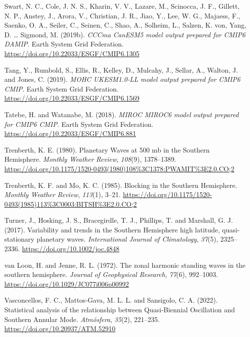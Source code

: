 \documentclass[12pt,oneside,a4paper]{reedthesis}
\newlength{\cslhangindent}
\newenvironment{CSLReferences}[2] %
 {%
  \setlength{\parindent}{0pt}
  \ifodd #1 \everypar{\setlength{\hangindent}{\cslhangindent}}\ignorespaces\fi
  \ifnum #2 > 0
  \setlength{\parskip}{#2\baselineskip}
  \fi
 }%
 {}
\begin{document}
\begin{CSLReferences}{1}{0}
\leavevmode{}%
Swart, N. C., Cole, J. N. S., Kharin, V. V., Lazare, M., Scinocca, J. F., Gillett, N. P., Anstey, J., Arora, V., Christian, J. R., Jiao, Y., Lee, W. G., Majaess, F., Saenko, O. A., Seiler, C., Seinen, C., Shao, A., Solheim, L., Salzen, K. von, Yang, D. \ldots{} Sigmond, M. (2019b). \emph{CCCma CanESM5 model output prepared for CMIP6 DAMIP}. Earth System Grid Federation. \url{https://doi.org/10.22033/ESGF/CMIP6.1305}

\leavevmode{}%
Tang, Y., Rumbold, S., Ellis, R., Kelley, D., Mulcahy, J., Sellar, A., Walton, J. and Jones, C. (2019). \emph{MOHC UKESM1.0-LL model output prepared for CMIP6 CMIP}. Earth System Grid Federation. \url{https://doi.org/10.22033/ESGF/CMIP6.1569}

\leavevmode{}%
Tatebe, H. and Watanabe, M. (2018). \emph{MIROC MIROC6 model output prepared for CMIP6 CMIP}. Earth System Grid Federation. \url{https://doi.org/10.22033/ESGF/CMIP6.881}

\leavevmode{}%
Trenberth, K. E. (1980). Planetary {Waves} at 500 mb in the {Southern Hemisphere}. \emph{Monthly Weather Review}, \emph{108}(9), 1378--1389. \url{https://doi.org/10.1175/1520-0493(1980)108\%3C1378:PWAMIT\%3E2.0.CO;2}

\leavevmode{}%
Trenberth, K. F. and Mo, K. C. (1985). Blocking in the {Southern Hemisphere}. \emph{Monthly Weather Review}, \emph{113}(1), 3--21. \url{https://doi.org/10.1175/1520-0493(1985)113\%3C0003:BITSH\%3E2.0.CO;2}

\leavevmode{}%
Turner, J., Hosking, J. S., Bracegirdle, T. J., Phillips, T. and Marshall, G. J. (2017). Variability and trends in the {Southern Hemisphere} high latitude, quasi-stationary planetary waves. \emph{International Journal of Climatology}, \emph{37}(5), 2325--2336. \url{https://doi.org/10.1002/joc.4848}

\leavevmode{}%
van Loon, H. and Jenne, R. L. (1972). The zonal harmonic standing waves in the southern hemisphere. \emph{Journal of Geophysical Research}, \emph{77}(6), 992--1003. \url{https://doi.org/10.1029/JC077i006p00992}

\leavevmode{}%
Vasconcellos, F. C., Mattos-Gava, M. L. L. and Sansigolo, C. A. (2022). Statistical analysis of the relationship between {Quasi-Biennial Oscillation} and {Southern Annular Mode}. \emph{Atm{ó}sfera}, \emph{35}(2), 221--235. \url{https://doi.org/10.20937/ATM.52910}


\end{CSLReferences}
\end{document}

